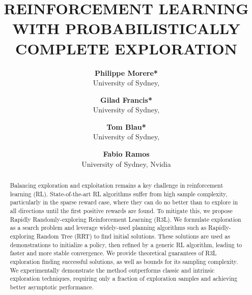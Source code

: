 \documentclass{article}
\title{REINFORCEMENT LEARNING WITH
PROBABILISTICALLY COMPLETE EXPLORATION}
\author{\textbf{Philippe Morere*}\\
University of Sydney, 
 \and \textbf{Gilad Francis*}\\
University of Sydney,
 \and \textbf{Tom Blau*}\\
University of Sydney, 
 \and \textbf{Fabio Ramos}\\
University of Sydney, Nvidia
 }
\date{}
\begin{document}
\maketitle
\begin{abstract}
    Balancing exploration and exploitation remains a key challenge in reinforcement
learning (RL). State-of-the-art RL algorithms suffer from high sample complexity,
particularly in the sparse reward case, where they can do no better than to explore in
all directions until the first positive rewards are found. To mitigate this, we propose
Rapidly Randomly-exploring Reinforcement Learning (R3L). We formulate exploration as a search problem and leverage widely-used planning algorithms such as
Rapidly-exploring Random Tree (RRT) to find initial solutions. These solutions are
used as demonstrations to initialize a policy, then refined by a generic RL algorithm,
leading to faster and more stable convergence. We provide theoretical guarantees
of R3L exploration finding successful solutions, as well as bounds for its sampling
complexity. We experimentally demonstrate the method outperforms classic and
intrinsic exploration techniques, requiring only a fraction of exploration samples
and achieving better asymptotic performance.

\end{abstract}
\end{document}
